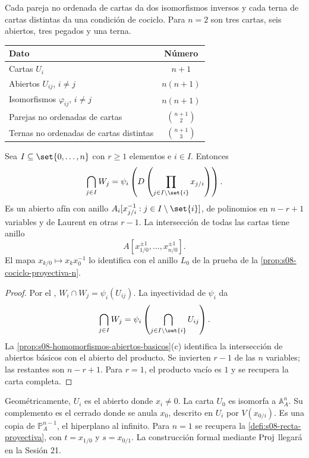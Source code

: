 \begin{obs}
\label{obs:s08-cantidad-datos-proyectivos}
Cada pareja no ordenada de cartas da dos isomorfismos inversos y cada terna de cartas distintas da una condición de cociclo. Para $n=2$ son tres cartas, seis abiertos, tres pegados y una terna.
\begin{center}
\begin{tabular}{lc}
\hline
Dato & Número\\
\hline
Cartas $U_i$ & $n+1$\\
Abiertos $U_{ij}$, $i\ne j$ & $n(n+1)$\\
Isomorfismos $\varphi_{ij}$, $i\ne j$ & $n(n+1)$\\
Parejas no ordenadas de cartas & $\binom{n+1}{2}$\\
Ternas no ordenadas de cartas distintas & $\binom{n+1}{3}$\\
\hline
\end{tabular}
\end{center}
\end{obs}

\begin{prop}
\label{prop:s08-intersecciones-cartas-proyectivas}
Sea $I\subseteq\set{0,\ldots,n}$ con $r\ge1$ elementos e $i\in I$. Entonces
\[
\bigcap_{j\in I}W_j
=\psi_i\left(D\left(\prod_{j\in I\setminus\set{i}}x_{j/i}\right)\right).
\]
Es un abierto afín con anillo $A_i[x_{j/i}^{-1}:j\in I\setminus\set{i}]$, de polinomios en $n-r+1$ variables y de Laurent en otras $r-1$. La intersección de todas las cartas tiene anillo
\[
A[x_{1/0}^{\pm1},\ldots,x_{n/0}^{\pm1}].
\]
El mapa $x_{k/0}\mapsto x_kx_0^{-1}$ lo identifica con el anillo $L_0$ de la prueba de la \cref{prop:s08-cociclo-proyectiva-n}.
\end{prop}
\begin{proof}
Por el , $W_i\cap W_j=\psi_i(U_{ij})$. La inyectividad de $\psi_i$ da
\[
\bigcap_{j\in I}W_j
=\psi_i\left(\bigcap_{j\in I\setminus\set{i}}U_{ij}\right).
\]
La \cref{prop:s08-homomorfismos-abiertos-basicos}(c) identifica la intersección de abiertos básicos con el abierto del producto. Se invierten $r-1$ de las $n$ variables; las restantes son $n-r+1$. Para $r=1$, el producto vacío es $1$ y se recupera la carta completa.
\end{proof}

\begin{obs}
\label{obs:s08-hiperplano-infinito}
Geométricamente, $U_i$ es el abierto donde $x_i\ne0$. La carta $U_0$ es isomorfa a $\mathbb A_A^n$. Su complemento es el cerrado donde se anula $x_0$, descrito en $U_i$ por $V(x_{0/i})$. Es una copia de $\mathbb P_A^{n-1}$, el hiperplano al infinito. Para $n=1$ se recupera la \cref{defi:s08-recta-proyectiva}, con $t=x_{1/0}$ y $s=x_{0/1}$. La construcción formal mediante $\operatorname{Proj}$ llegará en la Sesión 21.
\end{obs}

